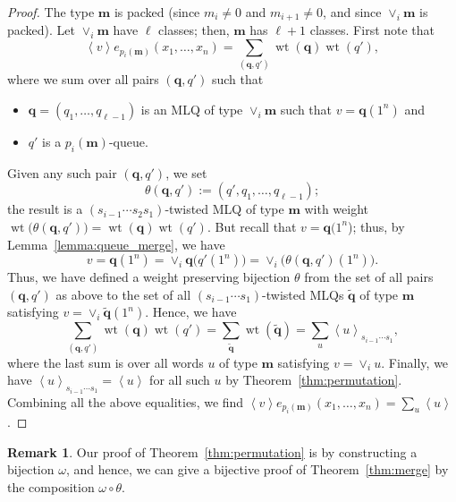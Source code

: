 \documentclass[reqno]{amsart}
\newcommand{\0}{\phantom{c}}
\newcommand{\swt}[1]{\left\langle #1 \right\rangle} %
\newcommand{\merge}[1]{\vee_{#1}} %
\DeclareMathOperator{\wt}{wt} %
\newcommand{\mm}{\mathbf{m}}
\newcommand{\qq}{\mathbf{q}}
\let\sumnonlimits\sum
\renewcommand{\sum}{\sumnonlimits\limits}
\newcommand{\tup}[1]{\left( #1 \right)}
\theoremstyle{plain}
\theoremstyle{definition}
\newtheorem{remark}[thm]{Remark}
\numberwithin{equation}{section}
\begin{document}
\begin{proof}
  The type $\mm$ is packed (since $m_i \neq 0$ and $m_{i+1} \neq 0$,
  and since $\merge{i}\mm$ is packed).
  Let $\merge{i}\mm$ have $\ell$ classes; then, $\mm$ has $\ell+1$
  classes.
  First note that
  \[
  \swt{v} e_{p_i(\mm)}(x_1, \dotsc, x_n) = \sum_{(\qq,q')} \wt(\qq) \wt(q'),
  \]
  where we sum over all pairs $(\qq, q')$ such that
  \begin{itemize}
  \item $\qq = (q_1, \dotsc, q_{\ell-1})$ is an MLQ of type $\merge{i}\mm$ such that $v = \qq(1^n)$ and
  \item $q'$ is a $p_i(\mm)$-queue.
  \end{itemize}
  Given any such pair $\tup{\qq, q'}$, we set
  \[
  \theta(\qq, q') := (q', q_1, \dotsc, q_{\ell-1});
  \]
  the result is a $(s_{i-1} \dotsm s_2 s_1)$-twisted MLQ of type $\mm$ with weight
  $\wt\bigl( \theta(\qq, q') \bigr) = \wt(\qq) \wt(q')$.
  But recall that $v = \qq(1^n$); thus, by Lemma~\ref{lemma:queue_merge}, we have
  \[
  v = \qq(1^n) = \merge{i} \qq\bigl( q'(1^n) \bigr) = \merge{i} \bigl( \theta(\qq, q')(1^n) \bigr).
  \]
  Thus, we have defined a weight preserving bijection $\theta$ from the set of all pairs $(\qq, q')$ as above
  to the set of all $(s_{i-1} \dotsm s_1)$-twisted MLQs $\widetilde{\qq}$ of type $\mm$ satisfying $v = \merge{i} \widetilde{\qq} (1^n)$.
  Hence, we have
  \[
  \sum_{(\qq,q')} \wt(\qq) \wt(q')
  = \sum_{\widetilde{\qq}} \wt(\widetilde{\qq})
  = \sum_u \swt{u}_{s_{i-1} \dotsm s_1} ,
  \]
  where the last sum is over all words $u$ of type $\mm$ satisfying $v = \merge{i} u$.
  Finally, we have $\swt{u}_{s_{i-1} \dotsm s_1} = \swt{u}$ for all such $u$ by Theorem~\ref{thm:permutation}.
  Combining all the above equalities, we find $\swt{v} e_{p_i(\mm)}(x_1, \dotsc, x_n) = \sum_u \swt{u}$.
\end{proof}

\begin{remark}
\label{rmk:bijective_proof}
Our proof of Theorem~\ref{thm:permutation} is by constructing a bijection $\omega$, and hence, we can give a bijective proof of Theorem~\ref{thm:merge} by the composition $\omega \circ \theta$.
\end{remark}
\end{document}

